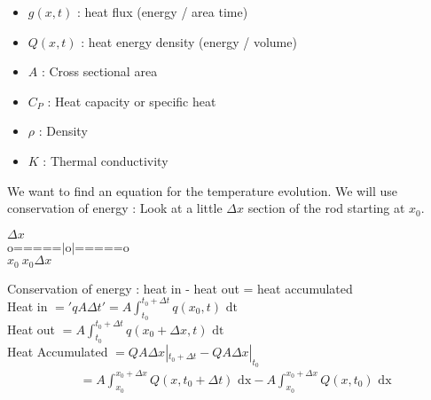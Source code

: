 \dfn
\begin{itemize}
  \item $g(x, t)$ : heat flux (energy / area time)
  \item $Q(x, t)$ : heat energy density (energy / volume)
  \item $A$ : Cross sectional area
  \item $C_P$ : Heat capacity or specific heat
  \item $\rho$ : Density
  \item $K$ : Thermal conductivity
\end{itemize}
We want to find an equation for the temperature evolution. We will use conservation of energy : Look at a little $\Delta x$ section of the rod starting at $x_0$.
\begin{center}
  $\Delta x$\\
  o=====$|$o$|$=====o\\
  $x_0\  x_0\Delta x$
\end{center}
Conservation of energy : heat in - heat out = heat accumulated\\
Heat in $ = 'qA\Delta t' = A \int_{t_0}^{t_0 + \Delta t} q(x_0, t) \text{ dt}$\\
Heat out $ = A\int_{t_0}^{t_0 + \Delta t} q(x_0 + \Delta x, t) \text{ dt}$\\
Heat Accumulated $ = QA\Delta x |_{t_0 + \Delta t} - QA\Delta x|_{t_0}$
\begin{align}
  & = A\int^{x_0 + \Delta x}_{x_0} Q(x, t_0 + \Delta t) \text{ dx} - A\int^{x_0 + \Delta x}_{x_0} Q(x, t_0) \text{ dx}
\end{align}
\newpage
